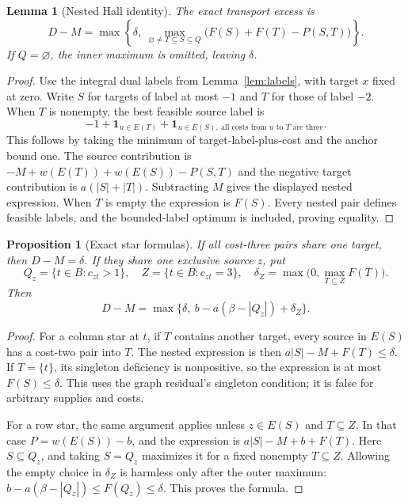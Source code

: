 \documentclass[11pt]{article}
\newtheorem{lemma}[theorem]{Lemma}
\newtheorem{proposition}[theorem]{Proposition}
\theoremstyle{remark}
\begin{document}
\begin{lemma}[Nested Hall identity]\label{lem:nested}
The exact transport excess is
\[
 D-M=\max\left\{\delta,\ \max_{\varnothing\ne T\subseteq S\subseteq Q}
       \bigl(F(S)+F(T)-P(S,T)\bigr)\right\}.
\]
If $Q=\varnothing$, the inner maximum is omitted, leaving $\delta$.
\end{lemma}
\begin{proof}
Use the integral dual labels from Lemma~\ref{lem:labels}, with target $x$ fixed at zero. Write $S$ for targets of label at most $-1$ and $T$ for those of label $-2$. When $T$ is nonempty, the best feasible source label is
\[
 -1+\boldsymbol1_{u\in E(T)}+
 \boldsymbol1_{u\in E(S),\ \text{all costs from }u\text{ to }T\text{ are three}}.
\]
This follows by taking the minimum of target-label-plus-cost and the anchor bound one. The source contribution is $-M+w(E(T))+w(E(S))-P(S,T)$ and the negative target contribution is $a(|S|+|T|)$. Subtracting $M$ gives the displayed nested expression. When $T$ is empty the expression is $F(S)$. Every nested pair defines feasible labels, and the bounded-label optimum is included, proving equality.
\end{proof}

\begin{proposition}[Exact star formulas]\label{prop:stars}
If all cost-three pairs share one target, then $D-M=\delta$.
If they share one exclusive source $z$, put
\[
 Q_z=\{t\in B:c_{zt}>1\},\quad Z=\{t\in B:c_{zt}=3\},\quad
 \delta_Z=\max\bigl(0,\max_{T\subseteq Z}F(T)\bigr).
\]
Then
\[
 D-M=\max\bigl\{\delta,\ b-a(\beta-|Q_z|)+\delta_Z\bigr\}.
\]
\end{proposition}
\begin{proof}
For a column star at $t$, if $T$ contains another target, every source in $E(S)$ has a cost-two pair into $T$. The nested expression is then $a|S|-M+F(T)\le\delta$. If $T=\{t\}$, its singleton deficiency is nonpositive, so the expression is at most $F(S)\le\delta$. This uses the graph residual's singleton condition; it is false for arbitrary supplies and costs.

For a row star, the same argument applies unless $z\in E(S)$ and $T\subseteq Z$. In that case $P=w(E(S))-b$, and the expression is $a|S|-M+b+F(T)$. Here $S\subseteq Q_z$, and taking $S=Q_z$ maximizes it for a fixed nonempty $T\subseteq Z$. Allowing the empty choice in $\delta_Z$ is harmless only after the outer maximum: $b-a(\beta-|Q_z|)\le F(Q_z)\le\delta$. This proves the formula.
\end{proof}
\end{document}
